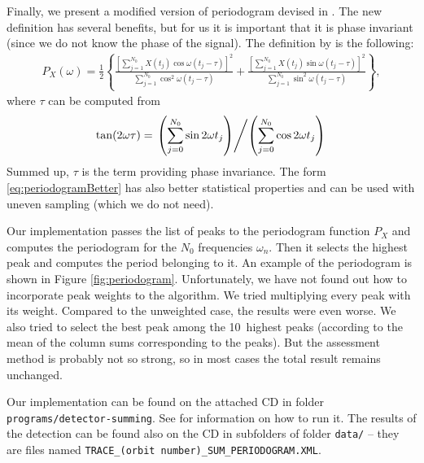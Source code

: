 Finally, we present a modified version of periodogram devised in \citep{Scargle1982}. The new definition has several benefits, but for us it is important that it is phase invariant (since we do not know the phase of the signal). The definition by \citep[p.~838]{Scargle1982} is the following:
\begin{align}
P_X(\omega) = \frac{1}{2} \left\lbrace \frac{\left[ \sum\limits_{j=1}^{N_0} X(t_j)\cos\omega (t_j - \tau) \right]^2}{\sum\limits_{j=1}^{N_0} \cos^2\omega (t_j - \tau)} + \frac{\left[\sum\limits_{j=1}^{N_0} X(t_j)\sin\omega (t_j - \tau) \right]^2}{\sum\limits_{j=1}^{N_0} \sin^2\omega (t_j - \tau)} \right\rbrace,
\label{eq:periodogramBetter}
\end{align} 
where $\tau$ can be computed from
\begin{align}
\tan(2\omega\tau) = \left. \left(\sum\limits_{j=0}^{N_0} \sin 2\omega t_j \right) \middle/ \left(\sum\limits_{j=0}^{N_0} \cos 2\omega t_j \right) \right.
\end{align} 
Summed up, $\tau$ is the term providing phase invariance. The form \eqref{eq:periodogramBetter} has also better statistical properties and can be used with uneven sampling (which we do not need)\citep[p.~849]{Scargle1982}.

Our implementation passes the list of peaks to the periodogram function $P_X$ and computes the periodogram for the $N_0$ frequencies $\omega_n$. Then it selects the highest peak and computes the period belonging to it. An example of the periodogram is shown in Figure \ref{fig:periodogram}. Unfortunately, we have not found out how to incorporate peak weights to the algorithm. We tried multiplying every peak with its weight. Compared to the unweighted case, the results were even worse. We also tried to select the best peak among the 10~highest peaks (according to the mean of the column sums corresponding to the peaks). But the assessment method is probably not so strong, so in most cases the total result remains unchanged. 

Our implementation can be found on the attached CD in folder \texttt{programs/detector-summing}. See  for information on how to run it. The results of the detection can be found also on the CD in subfolders of folder \texttt{data/} -- they are files named \texttt{TRACE\_(orbit number)\_SUM\_PERIODOGRAM.XML}.

